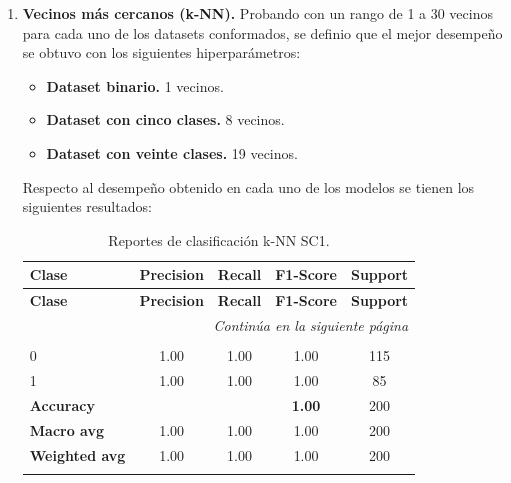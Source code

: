 \documentclass[12pt,a4paper]{article}
\begin{document}
\begin{enumerate}

  \item \textbf{Vecinos más cercanos (k-NN).}
  Probando con un rango de 1 a 30 vecinos para cada uno de los datasets conformados, se definio que el mejor desempeño se obtuvo 
  con los siguientes hiperparámetros:

  \begin{itemize}
    \item \textbf{Dataset binario.} 1 vecinos.
    \item \textbf{Dataset con cinco clases.} 8 vecinos.
    \item \textbf{Dataset con veinte clases.} 19 vecinos.
  \end{itemize}

  Respecto al desempeño obtenido en cada uno de los modelos se tienen los siguientes resultados:

  \small
  \setlength{\tabcolsep}{4pt}
  \begin{longtable}{@{}lcccc@{}}
    \toprule
    \textbf{Clase} & \textbf{Precision} & \textbf{Recall} & \textbf{F1-Score} & \textbf{Support} \\
    \midrule
    \endfirsthead

    \toprule
    \textbf{Clase} & \textbf{Precision} & \textbf{Recall} & \textbf{F1-Score} & \textbf{Support} \\
    \midrule
    \endhead

    \midrule
    \multicolumn{5}{r}{\emph{Continúa en la siguiente página}} \\
    \endfoot

    \bottomrule
    \caption{Reportes de clasificación k-NN SC1.}
    \label{tab:reportes_clasificacion_knn_sc1}
    \endlastfoot

    \multicolumn{5}{@{}l}{\textbf{(a) 2 clases}}\\
    0 & 1.00 & 1.00 & 1.00 & 115 \\
    1 & 1.00 & 1.00 & 1.00 & 85 \\
    \midrule
    \multicolumn{3}{l}{\textbf{Accuracy}} & \textbf{1.00} & 200 \\
    \textbf{Macro avg}    & 1.00 & 1.00 & 1.00 & 200 \\
    \textbf{Weighted avg} & 1.00 & 1.00 & 1.00 & 200 \\
    \addlinespace[0.8em]


\end{longtable}
\end{enumerate}
\end{document}
